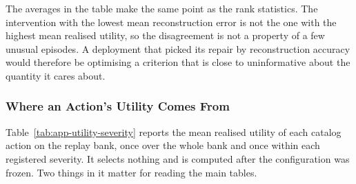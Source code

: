 \documentclass{article}
\begin{document}
\begin{table}[h]
  \caption{Reconstruction quality against realised forecasting utility, over the four catalog
  interventions and SAITS on the held-out evaluation episodes. Reconstruction error is measured on the
  hidden positions and realised utility against \textsc{Keep} on the same backbone. Winner
  agreement is the share of episodes on which the most accurate reconstruction is also the most
  useful intervention, and the discordant rate is the share of ordered pairs whose two rankings
  disagree.}
  \label{tab:app-recutils}
  \centering
  \small
  \setlength{\tabcolsep}{4pt}
\end{table}

The averages in the table make the same point as the rank statistics. The intervention with the
lowest mean reconstruction error is not the one with the highest mean realised utility, so the
disagreement is not a property of a few unusual episodes. A deployment that picked its repair
by reconstruction accuracy would therefore be optimising a criterion that is close to
uninformative about the quantity it cares about.

\subsubsection{Where an Action's Utility Comes From}
\label{app:utility-by-severity}
Table~\ref{tab:app-utility-severity} reports the mean realised utility of each catalog action
on the replay bank, once over the whole bank and once within each registered severity. It
selects nothing and is computed after the configuration was frozen. Two things in it matter for
reading the main tables.
\end{document}
